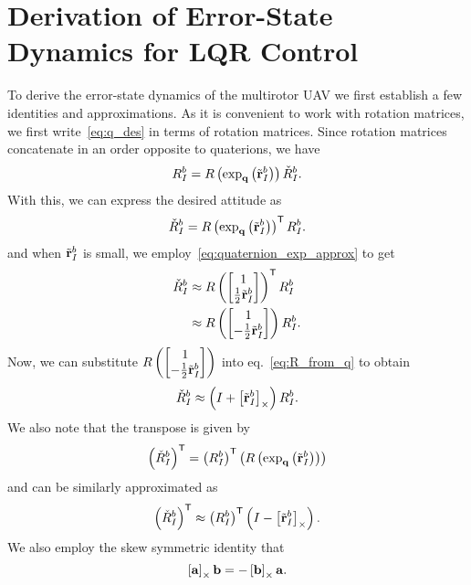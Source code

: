 \chapter{Derivation of Error-State Dynamics for LQR Control}
\label{apdx:control_err_state_derivation}

To derive the error-state dynamics of the multirotor UAV we first establish a few
identities and approximations. As it is convenient to work with rotation
matrices, we first write~\eqref{eq:q_des} in terms of rotation matrices. Since 
rotation matrices concatenate in an order opposite to quaterions, we have
\begin{equation}
  R_{I}^{b} = R\left(\exp_{\mathrm{\mathbf{q}}}\left(\tilde{\mathrm{\mathbf{r}}}_{I}^{b}\right)\right)
  \check{R}_{I}^{b}.
\end{equation}
With this, we can express the desired attitude as
\begin{equation}
  \check{R}_{I}^{b} =
  R\left(\exp_{\mathrm{\mathbf{q}}}\left(\tilde{\mathrm{\mathbf{r}}}_{I}^{b}\right)\right)^{\mathsf{T}} R_{I}^{b}.
\end{equation}
and when $\tilde{\mathrm{\mathbf{r}}}_I^b$ is small, we employ~\eqref{eq:quaternion_exp_approx} to get
\begin{align}
  \des{R}_{I}^{b} &\approx R\left(
  \begin{bmatrix}1\\\frac{1}{2}\tilde{\vect{r}}_I^b\end{bmatrix}
\right)^\transpose R_{I}^{b} \\
  \phantom{\des{R}_{I}^{b}} &\approx R\left(
  \begin{bmatrix}1\\-\frac{1}{2}\tilde{\vect{r}}_I^b\end{bmatrix}
\right) R_{I}^{b}.
\end{align}
Now, we can substitute $R\left( \begin{bmatrix}1\\-\frac{1}{2}\tilde{\mathrm{\mathbf{r}}}_I^b\end{bmatrix} \right)$ into eq.~\eqref{eq:R_from_q} to obtain
\begin{equation}
  \check{R}_{I}^{b} \approx \left( I + \left[ \tilde{\mathrm{\mathbf{r}}}_I^b \right]_{\times} \right)
  R_{I}^{b}.
\end{equation}
We also note that the transpose is given by
\begin{equation}
  \left(\check{R}_{I}^{b}\right)^{\mathsf{T}} =
  \left(R_{I}^{b}\right)^{\mathsf{T}}
  \left(R\left(\exp_{\mathrm{\mathbf{q}}}\left(\tilde{\mathrm{\mathbf{r}}}_{I}^{b}\right)\right)\right)
\end{equation}
and can be similarly approximated as
\begin{equation}
  \left(\check{R}_{I}^{b}\right)^{\mathsf{T}} \approx
  \left(R_{I}^{b}\right)^{\mathsf{T}} \left( I - \left[ \tilde{\mathrm{\mathbf{r}}}_I^b \right]_{\times}
  \right).
\end{equation}
We also employ the skew symmetric identity that
\begin{equation}
  \left[ \mathrm{\mathbf{a}} \right]_{\times} \mathrm{\mathbf{b}} = -\left[ \mathrm{\mathbf{b}} \right]_{\times} \mathrm{\mathbf{a}}.
\end{equation}

